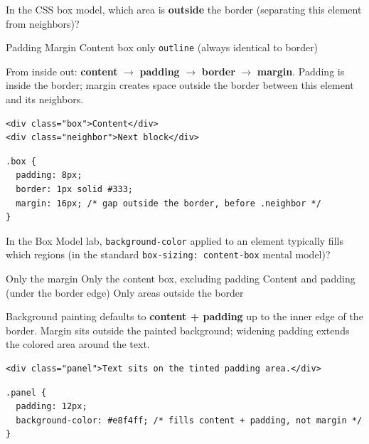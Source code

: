 \question[4]
In the CSS box model, which area is \textbf{outside} the border (separating this element from neighbors)?
\begin{choices}
  \choice Padding
  \CorrectChoice Margin
  \choice Content box only
  \choice \texttt{outline} (always identical to border)
\end{choices}
\begin{solution}
  From inside out: \textbf{content} $\rightarrow$ \textbf{padding} $\rightarrow$ \textbf{border} $\rightarrow$ \textbf{margin}. Padding is inside the border; margin creates space outside the border between this element and its neighbors.
\begin{lstlisting}[style=htmlinline]
<div class="box">Content</div>
<div class="neighbor">Next block</div>
\end{lstlisting}
\begin{lstlisting}[style=cssinline]
.box {
  padding: 8px;
  border: 1px solid #333;
  margin: 16px; /* gap outside the border, before .neighbor */
}
\end{lstlisting}
\end{solution}

\question[4]
In the Box Model lab, \texttt{background-color} applied to an element typically fills which regions (in the standard \texttt{box-sizing: content-box} mental model)?
\begin{choices}
  \choice Only the margin
  \choice Only the content box, excluding padding
  \CorrectChoice Content and padding (under the border edge)
  \choice Only areas outside the border
\end{choices}
\begin{solution}
  Background painting defaults to \textbf{content + padding} up to the inner edge of the border. Margin sits outside the painted background; widening padding extends the colored area around the text.
\begin{lstlisting}[style=htmlinline]
<div class="panel">Text sits on the tinted padding area.</div>
\end{lstlisting}
\begin{lstlisting}[style=cssinline]
.panel {
  padding: 12px;
  background-color: #e8f4ff; /* fills content + padding, not margin */
}
\end{lstlisting}
\end{solution}


\newpage

